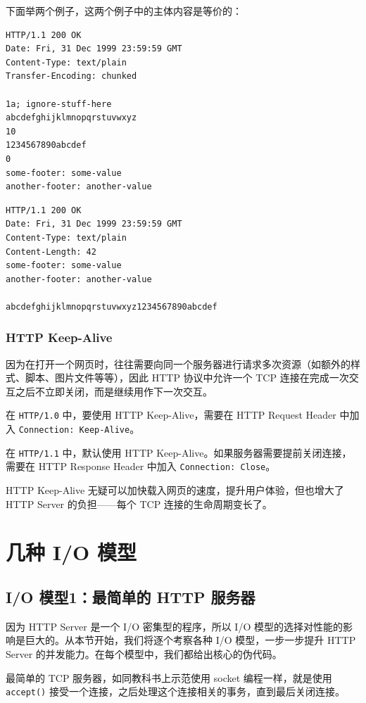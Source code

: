 \documentclass[a4paper]{article}
\begin{document}
下面举两个例子，这两个例子中的主体内容是等价的：

\begin{verbatim}
HTTP/1.1 200 OK
Date: Fri, 31 Dec 1999 23:59:59 GMT
Content-Type: text/plain
Transfer-Encoding: chunked

1a; ignore-stuff-here
abcdefghijklmnopqrstuvwxyz
10
1234567890abcdef
0
some-footer: some-value
another-footer: another-value
\end{verbatim}

\begin{verbatim}
HTTP/1.1 200 OK
Date: Fri, 31 Dec 1999 23:59:59 GMT
Content-Type: text/plain
Content-Length: 42
some-footer: some-value
another-footer: another-value

abcdefghijklmnopqrstuvwxyz1234567890abcdef
\end{verbatim}

\subsubsection{HTTP Keep-Alive}

因为在打开一个网页时，往往需要向同一个服务器进行请求多次资源（如额外的样式、脚本、图片文件等等），因此 HTTP 协议中允许一个 TCP 连接在完成一次交互之后不立即关闭，而是继续用作下一次交互。

在 \texttt{HTTP/1.0} 中，要使用 HTTP Keep-Alive，需要在 HTTP Request Header 中加入 \texttt{Connection:\ Keep-Alive}。

在 \texttt{HTTP/1.1} 中，默认使用 HTTP Keep-Alive。如果服务器需要提前关闭连接，需要在 HTTP Response Header 中加入 \texttt{Connection:\ Close}。

HTTP Keep-Alive 无疑可以加快载入网页的速度，提升用户体验，但也增大了 HTTP Server 的负担------每个 TCP 连接的生命周期变长了。

\section{几种 I/O 模型}


\subsection{I/O 模型1：最简单的 HTTP 服务器}

因为 HTTP Server 是一个 I/O 密集型的程序，所以 I/O 模型的选择对性能的影响是巨大的。从本节开始，我们将逐个考察各种 I/O 模型，一步一步提升 HTTP Server 的并发能力。在每个模型中，我们都给出核心的伪代码。

最简单的 TCP 服务器，如同教科书上示范使用 socket 编程一样，就是使用 \texttt{accept()} 接受一个连接，之后处理这个连接相关的事务，直到最后关闭连接。
\end{document}
